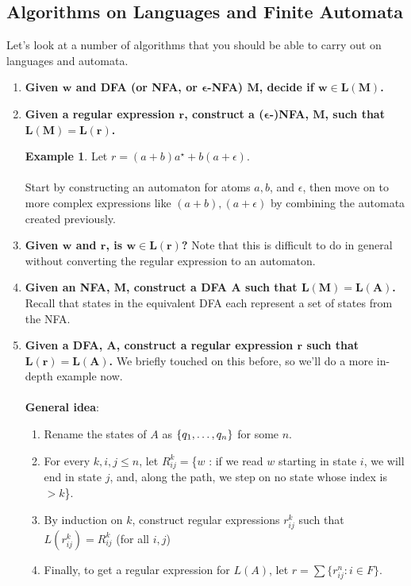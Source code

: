 \documentclass[]{article}
\DeclarePairedDelimiter{\set}{\lbrace}{\rbrace}
\theoremstyle{definition}
\newtheorem{ex}{Example}[section]
\newcommand{\lecture}[1]{\marginpar{{\footnotesize $\leftarrow$ \underline{#1}}}}
\begin{document}
      \subsection{Algorithms on Languages and Finite Automata} \lecture{October 10, 2013}
        Let's look at a number of algorithms that you should be able to carry out on languages and automata.

        \begin{enumerate}
          \item \textbf{Given $\boldsymbol{w}$ and DFA (or NFA, or $\boldsymbol{\epsilon}$-NFA) $\boldsymbol{M}$, decide if $\boldsymbol{w \in L(M)}$.}
          \item \textbf{Given a regular expression $\boldsymbol{r}$, construct a ($\boldsymbol{\epsilon}$-)NFA, $\boldsymbol{M}$, such that $\boldsymbol{L(M) = L(r)}$.}
          \begin{ex}
            Let $r = (a + b) a^\star + b(a + \epsilon)$.
            \\ \\
            Start by constructing an automaton for atoms $a, b$, and $\epsilon$, then move on to more complex expressions like $(a + b), (a + \epsilon)$ by combining the automata created previously.
          \end{ex}

          \item \textbf{Given $\boldsymbol{w}$ and $\boldsymbol{r}$, is $\boldsymbol{w \in L(r)}$?} Note that this is difficult to do in general without converting the regular expression to an automaton.

          \item \textbf{Given an NFA, $\boldsymbol{M}$, construct a DFA $\boldsymbol{A}$ such that $\boldsymbol{L(M) = L(A)}$.} Recall that states in the equivalent DFA each represent a set of states from the NFA.

          \item \textbf{Given a DFA, $\boldsymbol{A}$, construct a regular expression $\boldsymbol{r}$ such that $\boldsymbol{L(r) = L(A)}$.} We briefly touched on this before, so we'll do a more in-depth example now.
          \\ \\
          \textbf{General idea}:
          \begin{enumerate}
            \item Rename the states of $A$ as $\set{ q_1, \ldots, q_n }$ for some $n$.
            \item For every $k, i, j \le n$, let $R_{ij}^k = $\{$w$ : if we read $w$ starting in state $i$, we will end in state $j$, and, along the path, we step on no state whose index is $> k$\}.
            \item By induction on $k$, construct regular expressions $r_{ij}^k$ such that $L(r_{ij}^k) = R_{ij}^k$ (for all $i, j$)
            \item Finally, to get a regular expression for $L(A)$, let $r = \sum \{ r_{ij}^n : i \in F \}$.
          \end{enumerate}


\end{enumerate}
\end{document}
